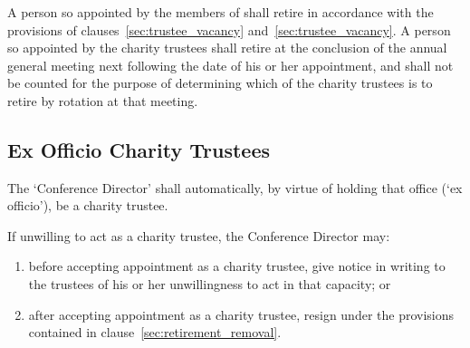        \subsubsection{}\label{sec:elected_trustee_retirement}
        A person so appointed by the members of \shortname{} shall retire in accordance with the provisions of clauses~\ref{sec:trustee_vacancy} and~\ref{sec:trustee_vacancy}. A person so appointed by the charity trustees shall retire at the conclusion of the annual general meeting next following the date of his or her appointment, and shall not be counted for the purpose of determining which of the charity trustees is to retire by rotation at that meeting.

    \subsection{Ex Officio Charity Trustees}
    The `Conference Director' shall automatically, by virtue of holding that office (`ex officio'), be a charity trustee.

    If unwilling to act as a charity trustee, the Conference Director may:
    \begin{enumerate}
        \item before accepting appointment as a charity trustee, give notice in writing to the trustees of his or her unwillingness to act in that capacity; or
        \item after accepting appointment as a charity trustee, resign under the provisions contained in clause~\ref{sec:retirement_removal}.
    \end{enumerate}
